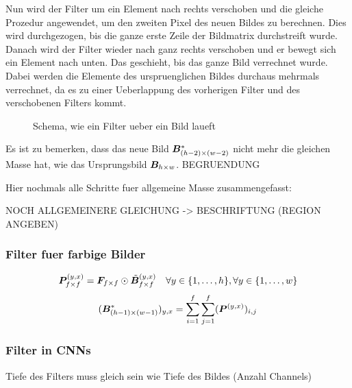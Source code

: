 \documentclass[../main]{subfiles}
\begin{document}
Nun wird der Filter um ein Element nach rechts verschoben und die gleiche
Prozedur angewendet, um den zweiten Pixel des neuen Bildes zu berechnen. Dies
wird durchgezogen, bis die ganze erste Zeile der Bildmatrix durchstreift wurde.
Danach wird der Filter wieder nach ganz rechts verschoben und er bewegt sich ein
Element nach unten. Das geschieht, bis das ganze Bild verrechnet wurde.
Dabei werden die Elemente des urspruenglichen Bildes durchaus mehrmals
verrechnet, da es zu einer Ueberlappung des vorherigen Filter und des
verschobenen Filters kommt.

\begin{figure}[h!]

  \caption{Schema, wie ein Filter ueber ein Bild laueft}
\end{figure}

Es ist zu bemerken, dass das neue Bild $\bm{B}_{(h-2) \times (w-2)}^*$ nicht mehr die gleichen Masse
hat, wie das Ursprungsbild $\bm{B}_{h \times w}$. BEGRUENDUNG
\para{}

Hier nochmals alle Schritte fuer allgemeine Masse zusammengefasst:


NOCH ALLGEMEINERE GLEICHUNG -> BESCHRIFTUNG (REGION ANGEBEN)
\para{}

\subsubsection{Filter fuer farbige Bilder}

\begin{equation}
  \bm{P}^{(y,x)}_{f \times f} = \bm{F}_{f \times f} \odot \tilde{\bm{B}}^{(y,x)}_{f \times f} \quad \forall y \in \{1,\ldots,h\}, \forall y \in \{1,\ldots,w\}
\end{equation}
\begin{equation}
  (\bm{B}_{(h-1) \times (w-1)}^*)_{y,x} = \sum_{i=1}^f \sum_{j=1}^f (\bm{P}^{(y,x)})_{i,j}
\end{equation}


\subsubsection{Filter in CNNs}
Tiefe des Filters muss gleich sein wie Tiefe des Bildes (Anzahl Channels)
\end{document}
